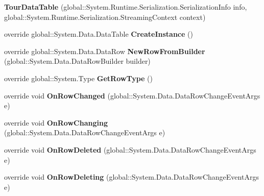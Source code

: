 \begin{DoxyCompactItemize}
\item 
{\bfseries Tour\+Data\+Table} (global\+::\+System.\+Runtime.\+Serialization.\+Serialization\+Info info, global\+::\+System.\+Runtime.\+Serialization.\+Streaming\+Context context)\hypertarget{class_products_1_1_data_1_1ds_sage_1_1_tour_data_table_a8b3e1f9c7f812f4552ec1254250d9078}{}\label{class_products_1_1_data_1_1ds_sage_1_1_tour_data_table_a8b3e1f9c7f812f4552ec1254250d9078}

\item 
override global\+::\+System.\+Data.\+Data\+Table {\bfseries Create\+Instance} ()\hypertarget{class_products_1_1_data_1_1ds_sage_1_1_tour_data_table_ab03f00f7531c4101b039640eaebf869f}{}\label{class_products_1_1_data_1_1ds_sage_1_1_tour_data_table_ab03f00f7531c4101b039640eaebf869f}

\item 
override global\+::\+System.\+Data.\+Data\+Row {\bfseries New\+Row\+From\+Builder} (global\+::\+System.\+Data.\+Data\+Row\+Builder builder)\hypertarget{class_products_1_1_data_1_1ds_sage_1_1_tour_data_table_a91db02943595c5404a2830eccd3eb788}{}\label{class_products_1_1_data_1_1ds_sage_1_1_tour_data_table_a91db02943595c5404a2830eccd3eb788}

\item 
override global\+::\+System.\+Type {\bfseries Get\+Row\+Type} ()\hypertarget{class_products_1_1_data_1_1ds_sage_1_1_tour_data_table_a564c5ccc9698865eb53a8bdc1c904eda}{}\label{class_products_1_1_data_1_1ds_sage_1_1_tour_data_table_a564c5ccc9698865eb53a8bdc1c904eda}

\item 
override void {\bfseries On\+Row\+Changed} (global\+::\+System.\+Data.\+Data\+Row\+Change\+Event\+Args e)\hypertarget{class_products_1_1_data_1_1ds_sage_1_1_tour_data_table_a6d46ce16a9a3d2d19164adf3d732d4ea}{}\label{class_products_1_1_data_1_1ds_sage_1_1_tour_data_table_a6d46ce16a9a3d2d19164adf3d732d4ea}

\item 
override void {\bfseries On\+Row\+Changing} (global\+::\+System.\+Data.\+Data\+Row\+Change\+Event\+Args e)\hypertarget{class_products_1_1_data_1_1ds_sage_1_1_tour_data_table_a16c4d9b67bf811f7aa5963b102bf3d23}{}\label{class_products_1_1_data_1_1ds_sage_1_1_tour_data_table_a16c4d9b67bf811f7aa5963b102bf3d23}

\item 
override void {\bfseries On\+Row\+Deleted} (global\+::\+System.\+Data.\+Data\+Row\+Change\+Event\+Args e)\hypertarget{class_products_1_1_data_1_1ds_sage_1_1_tour_data_table_a46b13abdf40fa8a2434330bedb343bea}{}\label{class_products_1_1_data_1_1ds_sage_1_1_tour_data_table_a46b13abdf40fa8a2434330bedb343bea}

\item 
override void {\bfseries On\+Row\+Deleting} (global\+::\+System.\+Data.\+Data\+Row\+Change\+Event\+Args e)\hypertarget{class_products_1_1_data_1_1ds_sage_1_1_tour_data_table_a99c963f69d9073b98bf7219d3f5a75e3}{}\label{class_products_1_1_data_1_1ds_sage_1_1_tour_data_table_a99c963f69d9073b98bf7219d3f5a75e3}

\end{DoxyCompactItemize}
